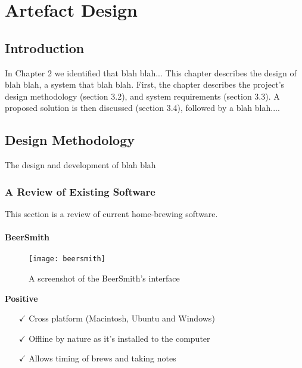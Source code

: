 \chapter{Artefact Design} \label{a-d}

\section{Introduction} \label{a-d--introduction}

In Chapter 2 we identified that blah blah...
This chapter describes the design of blah blah, a system that blah blah.  First, the chapter describes the project’s design methodology (section 3.2), and system requirements (section 3.3).  A proposed solution is then discussed (section 3.4), followed by a blah blah....


\section{Design Methodology} \label{a-d--methodology}

The design and development of blah blah

\subsection{A Review of Existing Software} \label{a-d--review-of-existing-software}

This section is a review of current home-brewing software.

\subsubsection{BeerSmith}

\begin{figure}[H]
  \centering
    \texttt{[image: beersmith]}
  \caption{A screenshot of the BeerSmith's interface}
  \label{figure-maltio}
\end{figure}

\noindent\textbf{Positive}

\begin{itemize}
  \item[$\checkmark$] Cross platform (Macintosh, Ubuntu and Windows)
  \item[$\checkmark$] Offline by nature as it's installed to the computer
  \item[$\checkmark$] Allows timing of brews and taking notes
\end{itemize}

